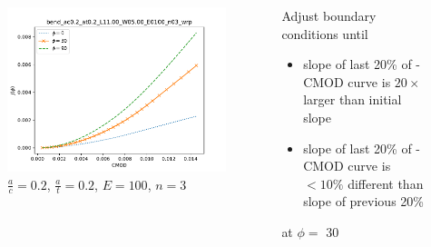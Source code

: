 \begin{frame}
\begin{columns}
\begin{column}{0.45\textwidth}
\begin{figure}[tbp]
\centering
\includegraphics[width=0.9\columnwidth]{J_CMOD_bend_ac02_at02_L1100_W0500_E0100_n03_wrp}
\caption{\(\frac{a}{c}=0.2\), \(\frac{a}{t}=0.2\), \(E=100\), \(n=3\)}
\end{figure}
\end{column}
\begin{column}{0.45\textwidth}
Adjust boundary conditions until
\begin{itemize}
\item slope of last 20\% of \J-CMOD curve is \(20\times\) larger than initial slope
\item slope of last 20\% of \J-CMOD curve is \(<10\%\) different than slope of previous 20\%
\end{itemize}
at \(\phi=\) \SI{30}{\SIUnitSymbolDegree}
\end{column}
\end{columns}
\note{
\vfill
}
\end{frame}


